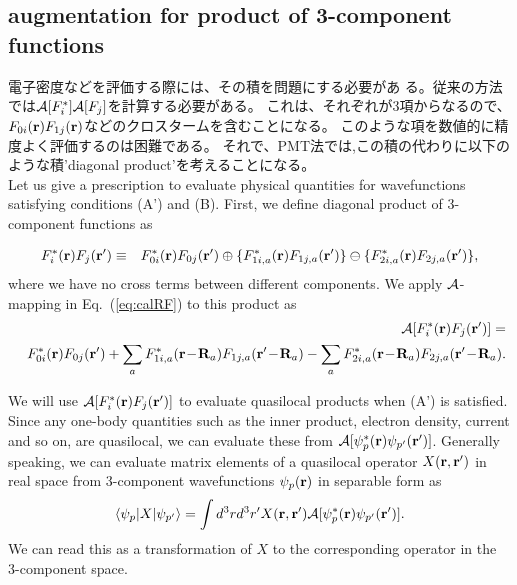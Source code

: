 \documentclass[twocolumn,showpacs,preprintnumbers,amsmath,amssymb,floatfix]{revtex4-1}
\newcommand{\bfr}{{\bf r}}
\newcommand{\bfR}{{\bf R}}
\newcommand{\ooplus}{\oplus}
\newcommand{\oominus}{\ominus}
\def\calR{{\cal A}}
\newcommand{\req}[1]{\mbox{Eq.~\!(\ref{#1})}}
\begin{document}
\subsection{augmentation for product of 3-component functions}
\label{aug3} 
電子密度などを評価する際には、その積を問題にする必要があ
る。従来の方法では$\calR[F^*_i]\calR[F_j]$を計算する必要がある。
これは、それぞれが3項からなるので、
$F_{0i}(\bfr) F_{1j}(\bfr)$などのクロスタームを含むことになる。 
このような項を数値的に精度よく評価するのは困難である。
それで、PMT法では,この積の代わりに以下のような積'diagonal product'を考えることになる。\\
Let us give a prescription to evaluate physical quantities
for wavefunctions satisfying conditions (A') and (B).  First, we define
diagonal product of 3-component functions as
\begin{widetext}
\begin{eqnarray}
F^*_i(\bfr)F_{j}(\bfr') &\equiv& F^*_{0i}(\bfr)F_{0j}(\bfr')
\ooplus  \{ F^*_{1i,a}(\bfr) F_{1j,a}(\bfr')\}
\oominus \{ F^*_{2i,a}(\bfr) F_{2j,a}(\bfr')\}, \label{fnproduct}
\end{eqnarray}
where we have no cross terms between different components.
We apply $\calR$-mapping in \req{eq:calRF} to this product as
\begin{eqnarray}
&&\calR[F^*_i(\bfr)F_{j}(\bfr')] = \nonumber \\ 
&&F^*_{0i}(\bfr)F_{0j}(\bfr')
+ \sum_a F^*_{1i,a}(\bfr\!-\!\bfR_a) F_{1j,a}(\bfr'\!-\!\bfR_a)
- \sum_a F^*_{2i,a}(\bfr\!-\!\bfR_a)F_{2j,a}(\bfr'\!-\!\bfR_a). \label{fnmap}
\end{eqnarray}
\end{widetext}
We will use $\calR[F^*_i(\bfr)F_{j}(\bfr')]$ to evaluate quasilocal 
products when (A') is satisfied.
Since any one-body quantities such as the inner product, electron density,
current and so on, are quasilocal, we can evaluate these from 
$\calR[\psi^*_p(\bfr)\psi_{p'}(\bfr')]$.
Generally speaking, we can evaluate matrix elements of a
quasilocal operator $X(\bfr,\bfr')$ in real space
from 3-component wavefunctions $\psi_p(\bfr)$ in separable form as 
\begin{eqnarray}
\langle \psi_p|X|\psi_{p'} \rangle=\int d^3r d^3r' X(\bfr,\bfr') 
\calR[\psi^*_p(\bfr)\psi_{p'}(\bfr')].
\end{eqnarray}
We can read this as a transformation of $X$ to the corresponding 
operator in the 3-component space.
\end{document}
